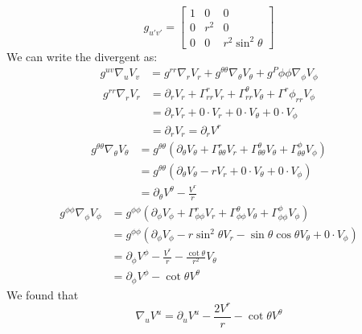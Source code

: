 \begin{equation}
    g_{u'v'} = \begin{bmatrix}
        1 & 0 & 0 \\
        0 & r^2 & 0 \\
        0 & 0 & r^2\sin^2\theta
    \end{bmatrix}
\end{equation}
We can write the divergent as:
\begin{align}
    g^{uv}\nabla_u V_v &= g^{rr} \nabla_r V_r + g^{\theta\theta}\nabla_\theta V_\theta + g^P\phi\phi\nabla_\phi V_\phi
\end{align}
\begin{align}
    g^{rr}\nabla_r V_r &= \partial_r V_r + \Gamma^r_{rr}V_r + \Gamma^\theta_{rr} V_\theta + \Gamma^r\phi_{rr} V_\phi \\
    &= \partial_r V_r + 0\cdot V_r + 0\cdot V_\theta + 0\cdot V_\phi \\ &= \partial_r V_r = \partial_r V^r
\end{align}
\begin{align}
    g^{\theta\theta} \nabla_\theta V_\theta &= g^{\theta\theta} \left(\partial_\theta V_\theta + \Gamma^{r}_{\theta\theta}V_r + \Gamma^{\theta}_{\theta\theta}V_\theta + \Gamma^{\phi}_{\theta\theta}V_\phi\right) \\
    &= g^{\theta\theta} \left(\partial_\theta V_\theta -r V_r + 0\cdot V_\theta + 0\cdot V_\phi\right) \\
    &= \partial_\theta V^\theta - \frac{V^r}{r}
\end{align}
\begin{align}
    g^{\phi\phi}\nabla_\phi V_\phi &= g^{\phi\phi}\left(\partial_\phi V_\phi + \Gamma^r_{\phi\phi} V_r + \Gamma^\theta_{\phi\phi}V_\theta + \Gamma^\phi_{\phi\phi} V_\phi \right) \\
    &=g^{\phi\phi}\left(\partial_\phi V_\phi -r\sin^2\theta V_r -\sin\theta\cos\theta V_\theta + 0\cdot V_\phi \right) \\
    &= \partial_\phi V^\phi - \frac{V^r}{r} - \frac{\cot{\theta}}{r^2} V_\theta \\
    &= \partial_\phi V^\phi - \cot{\theta} V^\theta
\end{align}
We found that
\begin{equation}
    \nabla_u V^u = \partial_u V^u - \frac{2V^r}{r} - \cot{\theta V^\theta}
\end{equation}
